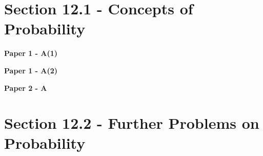 \documentclass[12pt, a4paper]{article}
\begin{document}
\section*{Section 12.1 - Concepts of Probability }\label{section:3-12-1}

\textbf{Paper 1 - A(1)}
\begin{enumx}[label=\arabic*.,start=1]
\item {}\label{DSE2017-CoreP1-Q07} 
\item {}\label{DSE2018-CoreP1-Q04} 
\item {}\label{DSE2019-CoreP1-Q08} 
\end{enumx}
\textbf{Paper 1 - A(2)}
\begin{enumx}[label=\arabic*.,start=4]
\item {}\label{DSE2012P-CoreP1-Q13} 
\end{enumx}
\textbf{Paper 2 - A}
\begin{enumx}[label=\arabic*.,start=5]
\item {}\label{DSE2012-CoreP2-Q28} 
\item {}\label{DSE2014-CoreP2-Q27} 
\item {}\label{DSE2015-CoreP2-Q28} 
\item {}\label{DSE2017-CoreP2-Q28} 
\item {}\label{DSE2022-CoreP2-Q28} 
\end{enumx}




\section*{Section 12.2 - Further Problems on Probability}\label{section:3-12-2}
\end{document}
